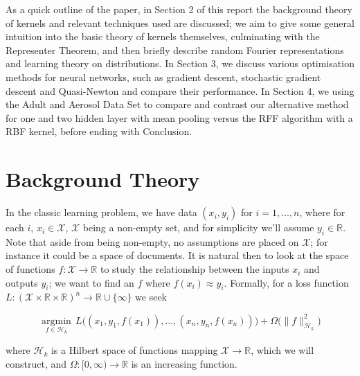 \documentclass{article} %
\begin{document}
As a quick outline of the paper, in Section 2 of this report the background theory of kernels and relevant techniques used are discussed; we aim to give some general intuition into the basic theory of kernels themselves, culminating with the Representer Theorem, and then briefly describe random Fourier representations and learning theory on distributions. In Section 3, we discuss various optimisation methods for neural networks, such as gradient descent, stochastic gradient descent and Quasi-Newton and compare their performance. In Section 4, we using the Adult and Aerosol Data Set to compare and contrast our alternative method for one and two hidden layer with mean pooling versus the RFF algorithm with a RBF kernel, before ending with Conclusion.


\section{Background Theory}

In the classic learning problem, we have data $(x_i,y_i)$ for $i=1,\dots,n$, where for each $i$, $x_i \in \mathcal{X}$, $\mathcal{X}$ being a non-empty set, and for simplicity we'll assume $y_i \in \mathbb{R}$. Note that aside from being non-empty, no assumptions are placed on $\mathcal{X}$; for instance it could be a space of documents. It is natural then to look at the space of functions $f: \mathcal{X}\rightarrow \mathbb{R}$ to study the relationship between the inputs $x_i$ and outputs $y_i$; we want to find an $f$ where $f(x_i)\approx y_i$. Formally, for a loss function $L: (\mathcal{X}\times\mathbb{R}\times\mathbb{R})^n \rightarrow \mathbb{R} \cup \{\infty\}$ we seek 

\begin{equation}
\label{prob1}
\underset{f \in \mathcal{H}_k}{\operatorname{argmin}} \, L\big((x_1,y_1,f(x_1)),\dots,(x_n,y_n,f(x_n))\big)+ \Omega\big(\|f\|^2_{\mathcal{H}_k}\big)
\end{equation}


\noindent where $\mathcal{H}_k$ is a Hilbert space of functions mapping $\mathcal{X}\rightarrow \mathbb{R}$, which we will construct, and $\Omega: [0,\infty)\rightarrow\mathbb{R}$ is an increasing function.
\end{document}
